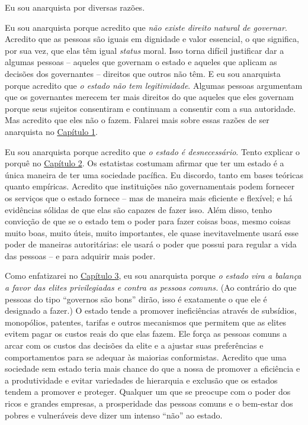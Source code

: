 Eu sou anarquista por diversas razões.

Eu sou anarquista porque acredito que \emph{não existe direito natural de governar}. Acredito que as pessoas são iguais em dignidade e valor essencial, o que significa, por sua vez, que elas têm igual \emph{status} moral. Isso torna difícil justificar dar a algumas pessoas -- aqueles que governam o estado e aqueles que aplicam as decisões dos governantes -- direitos que outros não têm. E eu sou anarquista porque acredito que \emph{o estado não tem legitimidade}. Algumas pessoas argumentam que os governantes merecem ter mais direitos do que aqueles que eles governam porque seus sujeitos consentiram e continuam a consentir com a sua autoridade. Mas acredito que eles não o fazem. Falarei mais sobre essas razões de ser anarquista no \hyperref[chap:1]{Capítulo 1}.

Eu sou anarquista porque acredito que \emph{o estado é desnecessário}. Tento explicar o porquê no \hyperref[chap:2]{Capítulo 2}. Os estatistas costumam afirmar que ter um estado é a única maneira de ter uma sociedade pacífica. Eu discordo, tanto em bases teóricas quanto empíricas. Acredito que instituições não governamentais podem fornecer os serviços que o estado fornece -- mas de maneira mais eficiente e flexível; e há evidências sólidas de que elas são capazes de fazer isso. Além disso, tenho convicção de que se o estado tem o poder para fazer coisas boas, mesmo coisas muito boas, muito úteis, muito importantes, ele quase inevitavelmente usará esse poder de maneiras autoritárias: ele usará o poder que possui para regular a vida das pessoas -- e para adquirir mais poder.

Como enfatizarei no \hyperref[chap:3]{Capítulo 3}, eu sou anarquista porque \emph{o estado vira a balança a favor das elites privilegiadas e contra as pessoas comuns.} (Ao contrário do que pessoas do tipo ``governos são bons'' dirão, isso é exatamente o que ele é designado a fazer.) O estado tende a promover ineficiências através de subsídios, monopólios, patentes, tarifas e outros mecanismos que permitem que as elites evitem pagar os custos reais do que elas fazem. Ele força as pessoas comuns a arcar com os custos das decisões da elite e a ajustar suas preferências e comportamentos para se adequar às maiorias conformistas. Acredito que uma sociedade sem estado teria mais chance do que a nossa de promover a eficiência e a produtividade e evitar variedades de hierarquia e exclusão que os estados tendem a promover e proteger. Qualquer um que se preocupe com o poder dos ricos e grandes empresas, a prosperidade das pessoas comuns e o bem-estar dos pobres e vulneráveis deve dizer um intenso ``não'' ao estado.

